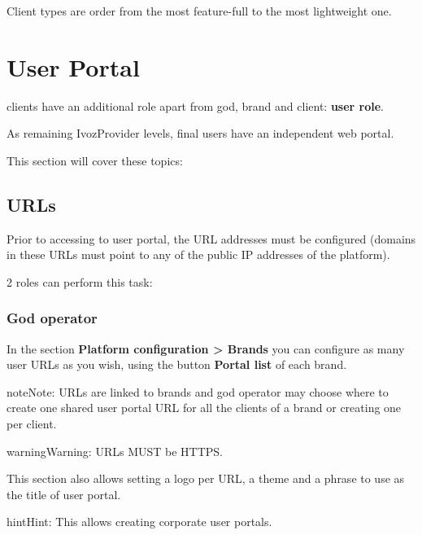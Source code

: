 \documentclass[letterpaper,10pt,english]{sphinxmanual}
\begin{document}
Client types are order from the most feature-full to the most lightweight one.


\chapter{User Portal}
\label{user_portal/index:userportal}\label{user_portal/index:user-portal}\label{user_portal/index::doc}
{\hyperref[administration_portal/brand/clients/virtual_pbx:virtual\string-pbx]{}} clients have an additional role apart from god, brand and client: \textbf{user role}.

As remaining IvozProvider levels, final users have an independent web portal.

This section will cover these topics:


\section{URLs}
\label{user_portal/urls::doc}\label{user_portal/urls:urls}
Prior to accessing to user portal, the URL addresses must be configured (domains
in these URLs must point to any of the public IP addresses of the platform).

2 roles can perform this task:


\subsection{God operator}
\label{user_portal/urls:god-operator}
In the section \textbf{Platform configuration \textgreater{} Brands} you can configure as many
user URLs as you wish, using the button \textbf{Portal list} of each brand.

\begin{notice}{note}{Note:}
URLs are linked to brands and god operator may choose where to create
one shared user portal URL for all the clients of a brand or creating
one per client.
\end{notice}

\begin{notice}{warning}{Warning:}
URLs MUST be HTTPS.
\end{notice}

This section also allows setting a logo per URL, a theme and a phrase to use as
the title of user portal.

\begin{notice}{hint}{Hint:}
This allows creating corporate user portals.
\end{notice}
\end{document}
